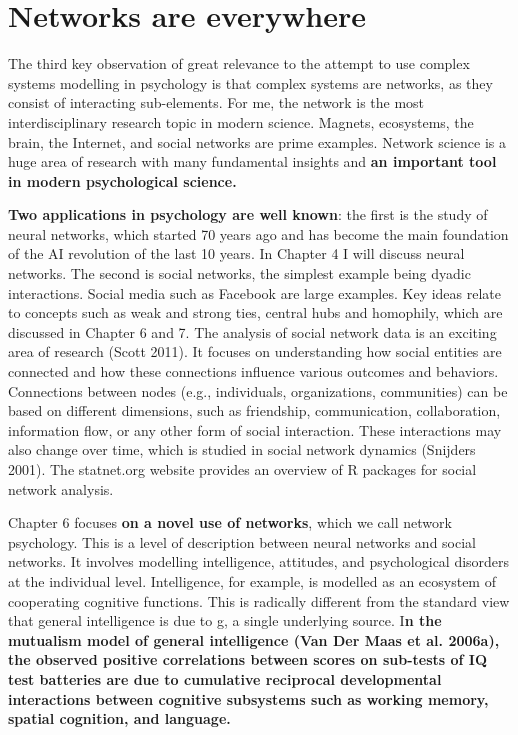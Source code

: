 \documentclass[
  letterpaper,
]{scrbook}
\begin{document}
\hypertarget{networks-are-everywhere}{%
\section{Networks are everywhere}\label{networks-are-everywhere}}

The third key observation of great relevance to the attempt to use
complex systems modelling in psychology is that complex systems are
networks, as they consist of interacting sub-elements. For me, the
network is the most interdisciplinary research topic in modern science.
Magnets, ecosystems, the brain, the Internet, and social networks are
prime examples. Network science is a huge area of research with many
fundamental insights and \textbf{an important tool in modern
psychological science.}

\textbf{Two applications in psychology are well known}: the first is the
study of neural networks, which started 70 years ago and has become the
main foundation of the AI revolution of the last 10 years. In Chapter 4
I will discuss neural networks. The second is social networks, the
simplest example being dyadic interactions. Social media such as
Facebook are large examples. Key ideas relate to concepts such as weak
and strong ties, central hubs and homophily, which are discussed in
Chapter 6 and 7. The analysis of social network data is an exciting area
of research (Scott 2011). It focuses on understanding how social
entities are connected and how these connections influence various
outcomes and behaviors. Connections between nodes (e.g., individuals,
organizations, communities) can be based on different dimensions, such
as friendship, communication, collaboration, information flow, or any
other form of social interaction. These interactions may also change
over time, which is studied in social network dynamics (Snijders 2001).
The statnet.org website provides an overview of R packages for social
network analysis.

Chapter 6 focuses \textbf{on a novel use of networks}, which we call
network psychology. This is a level of description between neural
networks and social networks. It involves modelling intelligence,
attitudes, and psychological disorders at the individual level.
Intelligence, for example, is modelled as an ecosystem of cooperating
cognitive functions. This is radically different from the standard view
that general intelligence is due to g, a single underlying source.
I\textbf{n the mutualism model of general intelligence (Van Der Maas et
al. 2006a), the observed positive correlations between scores on
sub-tests of IQ test batteries are due to cumulative reciprocal
developmental interactions between cognitive subsystems such as working
memory, spatial cognition, and language.}
\end{document}
